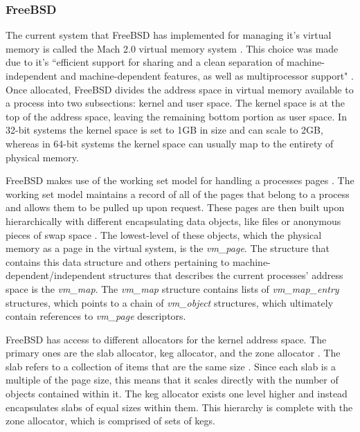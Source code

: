 \subsubsection{FreeBSD}
\label{sub:Memory Management FreeBSD}
\par The current system that FreeBSD has implemented for managing it's virtual memory is called the Mach 2.0 virtual memory system \cite{bsd:1}.
This choice was made due to it's ``efficient support for sharing and a clean separation of machine-independent and machine-dependent features, as well as multiprocessor support" \cite{bsd:1}.
Once allocated, FreeBSD divides the address space in virtual memory available to a process into two subsections: kernel and user space.
The kernel space is at the top of the address space, leaving the remaining bottom portion as user space.
In 32-bit systems the kernel space is set to 1GB in size and can scale to 2GB, whereas in 64-bit systems the kernel space can usually map to the entirety of physical memory.

\par FreeBSD makes use of the working set model for handling a processes pages \cite{bsd:1}.
The working set model maintains a record of all of the pages that belong to a process and allows them to be pulled up upon request.
These pages are then built upon hierarchically with different encapsulating data objects, like files or anonymous pieces of swap space \cite{bsd:1}.
The lowest-level of these objects, which the physical memory as a page in the virtual system, is the \textit{vm\_page}.
The structure that contains this data structure and others pertaining to machine-dependent/independent structures that describes the current processes' address space is the \textit{vm\_map}.
The \textit{vm\_map} structure contains lists of \textit{vm\_map\_entry} structures, which points to a chain of \textit{vm\_object} structures, which ultimately contain references to \textit{vm\_page} descriptors.

\par FreeBSD has access to different allocators for the kernel address space.
The primary ones are the slab allocator, keg allocator, and the zone allocator \cite{bsd:1}.
The slab refers to a collection of items that are the same size \cite{bsd:1}.
Since each slab is a multiple of the page size, this means that it scales directly with the number of objects contained within it.
The keg allocator exists one level higher and instead encapsulates slabs of equal sizes within them.
This hierarchy is complete with the zone allocator, which is comprised of sets of kegs.

